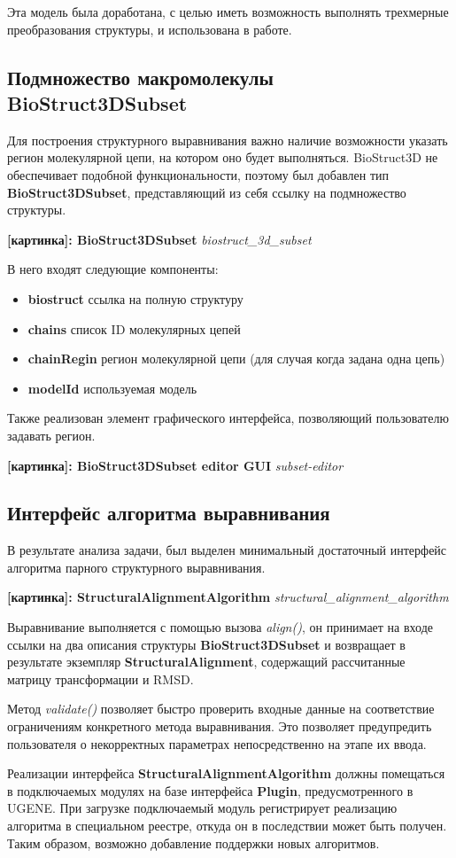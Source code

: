 \documentclass[a4paper, 12pt, titlepage, utf8]{extarticle}
\newcommand{\class}{\textbf}
\newcommand{\method}{\textit}
\newcommand{\myimage}[2]{   
    \begin{center} \textbf{[картинка]: #1} \textit{#2} \end{center} 
}
\begin{document}
Эта модель была доработана, с целью иметь возможность выполнять трехмерные преобразования структуры, и использована в работе.

\subsection{Подмножество макромолекулы BioStruct3DSubset}
Для построения структурного выравнивания важно наличие возможности указать регион молекулярной цепи, на котором оно будет выполняться. BioStruct3D не обеспечивает подобной функциональности, поэтому был добавлен тип \class{BioStruct3DSubset}, представляющий из себя ссылку на подмножество структуры.
\myimage{BioStruct3DSubset}{biostruct\_3d\_subset}

В него входят следующие компоненты:
\begin{itemize}
    \item \textbf{biostruct}  ссылка на полную структуру 
    \item \textbf{chains} список ID молекулярных цепей 
    \item \textbf{chainRegin} регион молекулярной цепи (для случая когда задана одна цепь)
    \item \textbf{modelId} используемая модель
\end{itemize}

Также реализован элемент графического интерфейса, позволяющий пользователю задавать регион.
\myimage{BioStruct3DSubset editor GUI}{subset-editor}

\subsection{Интерфейс алгоритма выравнивания}
В результате анализа задачи, был выделен минимальный достаточный интерфейс алгоритма парного структурного выравнивания. 

\myimage{StructuralAlignmentAlgorithm}{structural\_alignment\_algorithm}
Выравнивание выполняется с помощью вызова \method{align()}, он принимает на входе ссылки на два описания структуры \class{BioStruct3DSubset} и возвращает в результате экземпляр \class{StructuralAlignment}, содержащий рассчитанные матрицу трансформации и RMSD. 

Метод \method{validate()} позволяет быстро проверить входные данные на соответствие ограничениям конкретного метода выравнивания. Это позволяет предупредить пользователя о некорректных параметрах непосредственно на этапе их ввода.

Реализации интерфейса \class{StructuralAlignmentAlgorithm} должны помещаться в подключаемых модулях на базе интерфейса \class{Plugin}, предусмотренного в UGENE. При загрузке подключаемый модуль регистрирует реализацию алгоритма в специальном реестре, откуда он в последствии может быть получен. Таким образом, возможно добавление поддержки новых алгоритмов.
\end{document}

